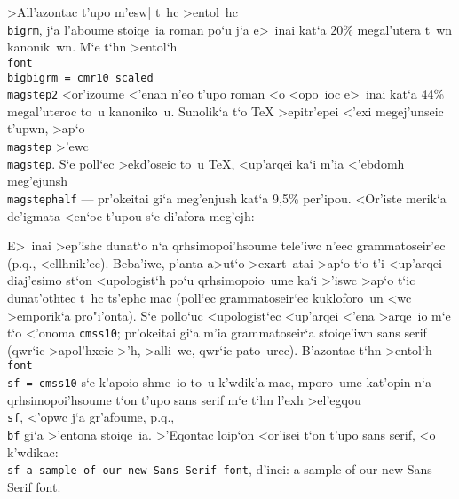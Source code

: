 >All'azontac t'upo m'esw| t~hc >entol~hc {\tt\\bigrm}, j`a l'aboume
stoiqe~ia {\rm roman} po`u j`a e>~inai kat`a 20\NB \% megal'utera t~wn
kanonik~wn.  M`e t`hn >entol`h {\tt \\font\\bigbigrm = cmr10 scaled
\\magstep\NB{}2} <or'izoume <'enan n'eo t'upo {\rm roman} <o <opo~ioc   
e>~inai kat`a 44\NB \% megal'uteroc to~u ka\-no\-ni\-ko~u.  Sunolik`a
t`o {\rm \TeX} >epitr'epei <'exi megej'unseic t'upwn, >ap`o {\tt
\\magstep{}} >'ewc {\tt \\magstep{}}. S`e poll`ec >ekd'oseic to~u
{\rm \TeX}, <up'arqei ka`i m'ia <'ebdomh meg'ejunsh {\tt \\magstephalf}
--- pr'okeitai gi`a meg'enjush kat`a 9,5\NB \% per'ipou. <Or'iste
merik`a de'igmata <en`oc t'upou s`e di'afora meg'ejh:

\bigskip

E>~inai >ep'ishc dunat`o n`a qrhsimopoi'hsoume tele'iwc n'eec           
grammatoseir'ec (p.q., <ellhnik'ec). Beba'iwc, p'anta a>ut`o >exart~atai
>ap`o t`o t'i <up'arqei diaj'esimo st`on <upologist`h po`u
qrhsi\-mo\-poi\-o~ume ka`i >'iswc >ap`o t`ic dunat'othtec t~hc ts'ephc
mac (poll`ec grammatoseir`ec kuklo\-fo\-ro~un <wc >emporik`a
pro"i'onta).  S`e pollo`uc <upologist`ec <up'arqei <'ena >arqe~io m`e
t`o <'onoma {\tt cmss10}; pr'okeitai gi`a m'ia grammatoseir`a stoiqe'iwn
{\rm sans serif} (qwr`ic >apol'hxeic >'h, >alli~wc, qwr`ic pato~urec).
B'azontac t`hn >entol`h {\tt \\font\\sf = cmss10} s`e k'apoio shme~io
to~u k'wdik'a mac, mporo~ume kat'opin n`a qrh\-simo\-poi'h\-soume t`on
t'upo {\rm sans serif} m`e t`hn l'exh >el'egqou {\tt\\sf}, <'opwc j`a
gr'afoume, p.q., {\tt\\bf} gi`a >'entona stoiqe~ia.  >'Eqo\-ntac loip`on
<or'isei t`on t'upo {\rm sans serif}, <o k'wdikac: {\tt\\sf a sample of
our new Sans Serif font}, d'inei: {\sf a sample of our new Sans Serif
font.}

